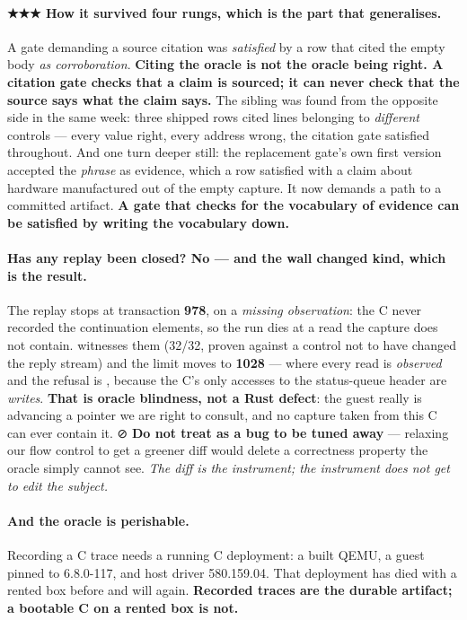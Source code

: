 \documentclass[10.5pt]{article}
\begin{document}
\paragraph{★★★ How it survived four rungs, which is the part that generalises.} A gate demanding
a  source citation was \emph{satisfied} by a row that cited the empty body \emph{as
corroboration}. \textbf{Citing the oracle is not the oracle being right. A citation gate checks
that a claim is sourced; it can never check that the source says what the claim says.} The
sibling was found from the opposite side in the same week: three shipped rows cited
 lines belonging to \emph{different} controls — every value right,
every address wrong, the citation gate satisfied throughout. And one turn deeper still: the
replacement gate's own first version accepted the \emph{phrase}  as evidence,
which a row satisfied with a claim about hardware manufactured out of the empty capture. It now
demands a path to a committed artifact. \textbf{A gate that checks for the vocabulary of evidence
can be satisfied by writing the vocabulary down.}

\paragraph{Has any replay been closed? No --- and the wall changed kind, which is the result.}
The  replay stops at transaction \textbf{978}, on a \emph{missing observation}: the C
never recorded the continuation elements, so the run dies at a read the capture does not contain.
 witnesses them (32/32, proven against a control not to have changed the reply
stream) and the limit moves to \textbf{1028} — where every read is \emph{observed} and the
refusal is , because the C's only accesses to the status-queue header are
\emph{writes}. \textbf{That is oracle blindness, not a Rust defect}: the guest really is
advancing a pointer we are right to consult, and no capture taken from this C can ever contain
it. ⊘ \textbf{Do not treat  as a bug to be tuned away} — relaxing our flow
control to get a greener diff would delete a correctness property the oracle simply cannot see.
\emph{The diff is the instrument; the instrument does not get to edit the subject.}

\paragraph{And the oracle is perishable.} Recording a C trace needs a running C deployment: a
built QEMU, a guest pinned to 6.8.0-117, and host driver 580.159.04. That deployment has died
with a rented box before and will again. \textbf{Recorded traces are the durable artifact; a
bootable C on a rented box is not.}
\end{document}
